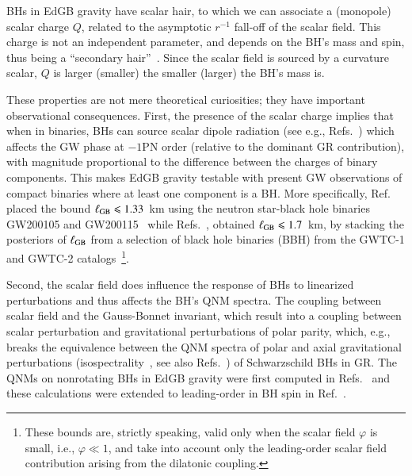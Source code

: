 \documentclass[twocolumn,
               prd,
               aps,
               superscriptaddress,
               tightenlines,
               nofootinbib,
               eqsecnum,
               amsfonts,
               amsmath,
               longbibliography]{revtex4-1}
\begin{document}
BHs in EdGB gravity have scalar hair, to which we can associate a (monopole) scalar charge $Q$,
related to the asymptotic $r^{-1}$ fall-off of the scalar field.
%
This charge is not an independent parameter, and depends on the BH's mass and spin, %
thus being a ``secondary hair''~\cite{Coleman:1991ku,Herdeiro:2015waa}.
%
Since the scalar field is sourced by a curvature scalar, $Q$ is larger (smaller)
the smaller (larger) the BH's mass is.

These properties are not mere theoretical curiosities; they have important observational consequences.
%
First, the presence of the scalar charge implies that when in binaries, BHs can source
scalar dipole radiation (see e.g., Refs.~\cite{Yagi:2011xp,Julie:2019sab,Shiralilou:2020gah,Shiralilou:2021mfl,Julie:2022huo})
which affects the GW phase at $-1$PN order (relative to the dominant GR
contribution), with magnitude proportional to the difference between the
charges of binary components. This makes EdGB gravity testable with present GW
observations of compact binaries where at least one component is a BH.
%
More specifically, Ref.~\cite{Lyu:2022gdr} placed the bound
%
$\ell_{\rm GB} \leqslant 1.33$~km
%
using the neutron star-black hole binaries GW200105 and
GW200115~\cite{LIGOScientific:2021qlt} while Refs.~\cite{Nair:2019iur,Perkins:2021mhb}, obtained
%
$\ell_{\rm GB} \leqslant 1.7$~km,
%
by stacking the posteriors of $\ell_{\rm GB}$ from a selection of black hole binaries (BBH)
from the GWTC-1 and GWTC-2 catalogs~\cite{LIGOScientific:2018mvr,LIGOScientific:2020ibl}\footnote{These bounds
are, strictly speaking, valid only when the scalar field $\varphi$ is small, i.e., $\varphi \ll 1$, and
take into account only the leading-order scalar field contribution arising from the dilatonic coupling.}.

Second, the scalar field does influence the response of BHs to linearized perturbations and thus
affects the BH's QNM spectra.
%
The coupling between scalar field and the Gauss-Bonnet invariant, which
result into a coupling between scalar perturbation and gravitational
perturbations of polar parity, which, e.g., breaks the equivalence
between the QNM spectra of polar and axial gravitational perturbations
(isospectrality~\cite{Chandrasekhar:1985kt}, see also Refs.~\cite{Glampedakis:2017rar,Lenzi:2021njy}) of Schwarzschild BHs in GR.
%
The QNMs on nonrotating BHs in EdGB gravity were first computed in
Refs.~\cite{Pani:2009wy,Blazquez-Salcedo:2016enn} and these calculations were
extended to leading-order in BH spin in Ref.~\cite{Pierini:2021jxd}.
\end{document}
